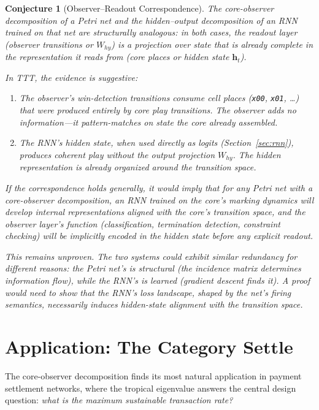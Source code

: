 \documentclass[11pt,a4paper]{article}
\newtheorem{conjecture}[theorem]{Conjecture}
\newcommand{\Settle}{\mathbf{Settle}}
\begin{document}
\begin{conjecture}[Observer--Readout Correspondence]
\label{conj:observer-readout}
The core-observer decomposition of a Petri net and the hidden--output
decomposition of an RNN trained on that net are structurally analogous:
in both cases, the readout layer (observer transitions or $W_{hy}$) is
a projection over state that is already complete in the representation
it reads from (core places or hidden state $\mathbf{h}_t$).

In TTT, the evidence is suggestive:
\begin{enumerate}
  \item The observer's win-detection transitions consume cell places
        (\texttt{x00}, \texttt{x01}, \ldots) that were produced
        entirely by core play transitions.  The observer adds no
        information---it pattern-matches on state the core already
        assembled.
  \item The RNN's hidden state, when used directly as logits
        (Section~\ref{sec:rnn}), produces coherent play without the
        output projection $W_{hy}$.  The hidden representation is
        already organized around the transition space.
\end{enumerate}
If the correspondence holds generally, it would imply that for any
Petri net with a core-observer decomposition, an RNN trained on the
core's marking dynamics will develop internal representations aligned
with the core's transition space, and the observer layer's function
(classification, termination detection, constraint checking) will be
implicitly encoded in the hidden state before any explicit readout.

This remains unproven.  The two systems could exhibit similar
redundancy for different reasons: the Petri net's is structural (the
incidence matrix determines information flow), while the RNN's is
learned (gradient descent finds it).  A proof would need to show that
the RNN's loss landscape, shaped by the net's firing semantics,
necessarily induces hidden-state alignment with the transition space.
\end{conjecture}

\section{Application: The Category $\Settle$}
\label{sec:settle}

The core-observer decomposition finds its most natural application in payment settlement networks, where the tropical eigenvalue answers the central design question: \emph{what is the maximum sustainable transaction rate?}
\end{document}
